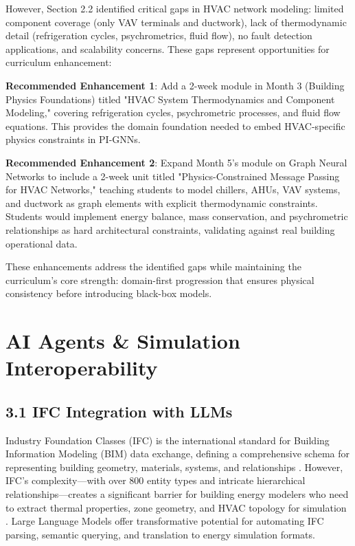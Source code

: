 \documentclass[12pt,a4paper]{article}
\begin{document}
However, Section 2.2 identified critical gaps in HVAC network modeling: limited component coverage (only VAV terminals and ductwork), lack of thermodynamic detail (refrigeration cycles, psychrometrics, fluid flow), no fault detection applications, and scalability concerns. These gaps represent opportunities for curriculum enhancement:

\textbf{Recommended Enhancement 1}: Add a 2-week module in Month 3 (Building Physics Foundations) titled "HVAC System Thermodynamics and Component Modeling," covering refrigeration cycles, psychrometric processes, and fluid flow equations. This provides the domain foundation needed to embed HVAC-specific physics constraints in PI-GNNs.

\textbf{Recommended Enhancement 2}: Expand Month 5's module on Graph Neural Networks to include a 2-week unit titled "Physics-Constrained Message Passing for HVAC Networks," teaching students to model chillers, AHUs, VAV systems, and ductwork as graph elements with explicit thermodynamic constraints. Students would implement energy balance, mass conservation, and psychrometric relationships as hard architectural constraints, validating against real building operational data.

These enhancements address the identified gaps while maintaining the curriculum's core strength: domain-first progression that ensures physical consistency before introducing black-box models.



\section{AI Agents \& Simulation Interoperability}

\subsection{3.1 IFC Integration with LLMs}

Industry Foundation Classes (IFC) is the international standard for Building Information Modeling (BIM) data exchange, defining a comprehensive schema for representing building geometry, materials, systems, and relationships \cite{ref45}. However, IFC's complexity---with over 800 entity types and intricate hierarchical relationships---creates a significant barrier for building energy modelers who need to extract thermal properties, zone geometry, and HVAC topology for simulation \cite{ref46}. Large Language Models offer transformative potential for automating IFC parsing, semantic querying, and translation to energy simulation formats.
\end{document}
